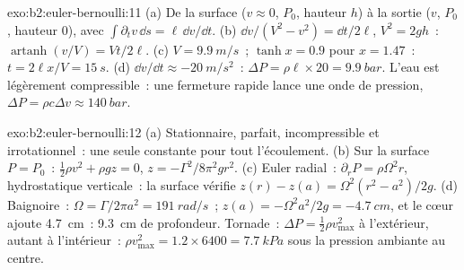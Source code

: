 \begin{solution}{exo:b2:euler-bernoulli:11}
(a) De la surface ($v \approx 0$, $P_0$, hauteur $h$) à la sortie ($v$, $P_0$,
hauteur $0$), avec $\int\partial_tv\,\dd s = \ell\,\dd v/\dd t$. (b) $\dd v/(V^2 -
v^2) = \dd t/2\ell$, $V^2 = 2gh$~: $\operatorname{artanh}(v/V) = Vt/2\ell$. (c) $V =
\qty{9.9}{m/s}$~; $\tanh x = 0.9$ pour $x = 1.47$~: $t = 2\ell x/V = \qty{15}{s}$. (d)
$\dd v/\dd t \approx \qty{-20}{m/s^2}$~: $\Delta P = \rho\ell \times 20 = \qty{9.9}{bar}$.
L'eau est légèrement compressible~: une fermeture rapide lance une onde
de pression, $\Delta P = \rho c\Delta v \approx \qty{140}{bar}$.
\end{solution}

\begin{solution}{exo:b2:euler-bernoulli:12}
(a) Stationnaire, parfait, incompressible et irrotationnel~: une seule constante
pour tout l'écoulement. (b) Sur la surface $P = P_0$~: $\tfrac12\rho v^2 + \rho gz =
0$, $z = -\Gamma^2/8\pi^2gr^2$. (c) Euler radial~: $\partial_rP = \rho\Omega^2r$,
hydrostatique verticale~: la surface vérifie $z(r) - z(a) = \Omega^2(r^2 -
a^2)/2g$. (d) Baignoire~: $\Omega = \Gamma/2\pi a^2 = \qty{191}{rad/s}$~; $z(a) = -\Omega^2a^2/
2g = \qty{-4.7}{cm}$, et le cœur ajoute \qty{4.7}{cm}~: \qty{9.3}{cm} de profondeur.
Tornade~: $\Delta P = \tfrac12\rho v_{\max}^2$ à l'extérieur, autant à l'intérieur~:
$\rho v_{\max}^2 = 1.2 \times 6400 = \qty{7.7}{kPa}$ sous la pression ambiante au centre.
\end{solution}

